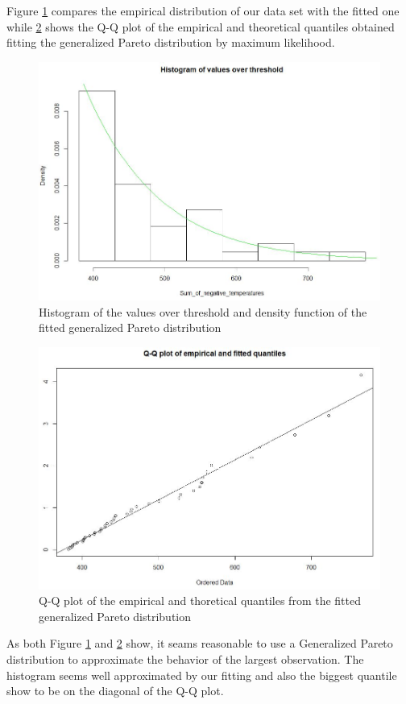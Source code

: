 \documentclass[11pt]{article}
\begin{document}
Figure \ref{miaFigura2} compares the empirical distribution of our data set with the fitted one while \ref{miaFigura3} shows the Q-Q plot of the empirical and theoretical quantiles obtained fitting the generalized Pareto distribution by maximum likelihood.
\begin{figure}[!h]
 \center
  \includegraphics[scale = 0.3]{miaFigura2.JPG}
  \caption{Histogram of the values over threshold and density function of the fitted generalized Pareto distribution}
  \label{miaFigura2}
\end{figure}
\begin{figure}[!h]
 \center
  \includegraphics[scale = 0.3]{miaFigura3.JPG}
  \caption{Q-Q plot of the empirical and thoretical quantiles from the fitted generalized Pareto distribution}
  \label{miaFigura3}
\end{figure}
As both Figure \ref{miaFigura2} and \ref{miaFigura3} show, it seams reasonable to use a Generalized Pareto distribution to approximate the behavior of the largest observation. The histogram seems well approximated by our fitting and also the biggest quantile show to be on the diagonal of the Q-Q plot.
\end{document}
